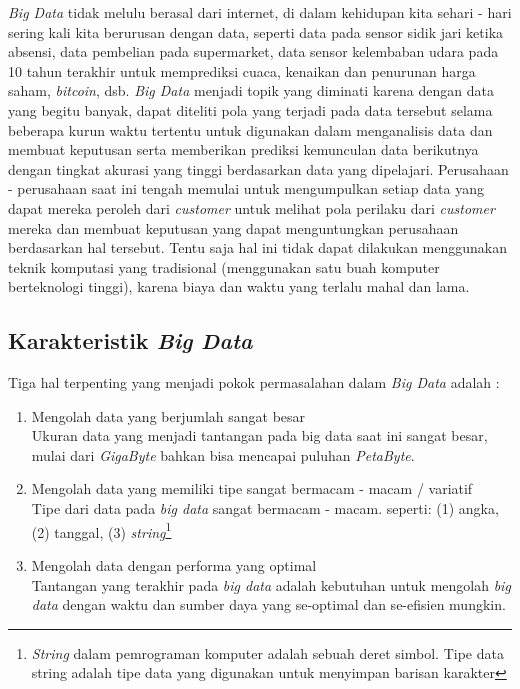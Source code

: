 {\it Big Data} tidak melulu berasal dari internet, di dalam kehidupan kita sehari - hari sering kali kita berurusan dengan data, seperti data pada sensor sidik jari ketika absensi, data pembelian pada supermarket, data sensor kelembaban udara pada 10 tahun terakhir untuk memprediksi cuaca, kenaikan dan penurunan harga saham, {\it bitcoin}, dsb. {\it Big Data} menjadi topik yang diminati karena dengan data yang begitu banyak, dapat diteliti pola yang terjadi pada data tersebut selama beberapa kurun waktu tertentu untuk digunakan dalam menganalisis data dan membuat keputusan serta memberikan prediksi kemunculan data berikutnya dengan tingkat akurasi yang tinggi berdasarkan data yang dipelajari. Perusahaan - perusahaan saat ini tengah memulai untuk mengumpulkan setiap data yang dapat mereka peroleh dari {\it customer} untuk melihat pola perilaku dari {\it customer} mereka dan membuat keputusan yang dapat menguntungkan perusahaan berdasarkan hal tersebut. Tentu saja hal ini tidak dapat dilakukan menggunakan teknik komputasi yang tradisional (menggunakan satu buah komputer berteknologi tinggi), karena biaya dan waktu yang terlalu mahal dan lama.

\subsection{Karakteristik {\it Big Data}}

 Tiga hal terpenting yang menjadi pokok permasalahan dalam {\it Big Data} adalah : 
\begin{enumerate}
	\item{Mengolah data yang berjumlah sangat besar} \\
	Ukuran data yang menjadi tantangan pada big data saat ini sangat besar, mulai dari \textit{GigaByte} bahkan bisa mencapai puluhan \textit{PetaByte}.
	\item{Mengolah data yang memiliki tipe sangat bermacam - macam / variatif} \\
	Tipe dari data pada \textit{big data} sangat bermacam - macam. seperti: (1) angka, (2) tanggal, (3) \textit{string}\footnote{\textit{String} dalam pemrograman komputer adalah sebuah deret simbol. Tipe data string adalah tipe data yang digunakan untuk menyimpan barisan karakter}
	\item{Mengolah data dengan performa yang optimal}\\
	Tantangan yang terakhir pada \textit{big data} adalah kebutuhan untuk mengolah \textit{big data} dengan waktu dan sumber daya yang se-optimal dan se-efisien mungkin.
\end{enumerate}

